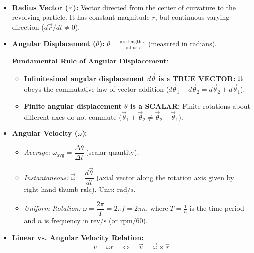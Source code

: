 \documentclass[11pt,a4paper]{article}
\begin{document}
\noindent{\large\textbf{\textsf{\textcolor{primaryDark}{2.1 Angular Variables \& Vector Character (Key Tips From Notes)}}}}\\[3pt]
\begin{itemize}[leftmargin=14pt,itemsep=2pt]
  \item \textbf{Radius Vector ($\vec{r}$):} Vector directed from the center of curvature to the revolving particle. It has constant magnitude $r$, but continuous varying direction ($d\vec{r}/dt \ne 0$).
  \item \textbf{Angular Displacement ($\theta$):} $\theta = \frac{\text{arc length } s}{\text{radius } r}$ (measured in radians).
  \begin{tcolorbox}[formulacard]
    \textbf{\textcolor{l3Crimson}{Fundamental Rule of Angular Displacement:}}
    \begin{itemize}[leftmargin=12pt,itemsep=1.5pt]
      \item \textbf{Infinitesimal angular displacement $d\vec{\theta}$ is a TRUE VECTOR:} It obeys the commutative law of vector addition ($d\vec{\theta}_1 + d\vec{\theta}_2 = d\vec{\theta}_2 + d\vec{\theta}_1$).
      \item \textbf{Finite angular displacement $\theta$ is a SCALAR:} Finite rotations about different axes do not commute ($\vec{\theta}_1 + \vec{\theta}_2 \ne \vec{\theta}_2 + \vec{\theta}_1$).
    \end{itemize}
  \end{tcolorbox}
  \item \textbf{Angular Velocity ($\omega$):}
    \begin{itemize}[leftmargin=12pt,itemsep=1pt]
      \item \textit{Average:} $\omega_{\text{avg}} = \dfrac{\Delta\theta}{\Delta t}$ (scalar quantity).
      \item \textit{Instantaneous:} $\vec{\omega} = \dfrac{d\vec{\theta}}{dt}$ (axial vector along the rotation axis given by right-hand thumb rule). Unit: $\text{rad/s}$.
      \item \textit{Uniform Rotation:} $\omega = \dfrac{2\pi}{T} = 2\pi f = 2\pi n$, where $T = \frac{1}{n}$ is the time period and $n$ is frequency in $\text{rev/s}$ (or $\text{rpm}/60$).
    \end{itemize}
  \item \textbf{Linear vs. Angular Velocity Relation:}
  \[
    v = \omega r \quad \iff \quad \vec{v} = \vec{\omega} \times \vec{r}
  \]
\end{itemize}
\end{document}
